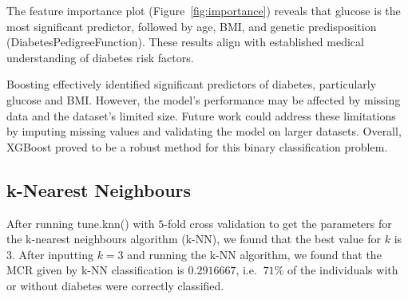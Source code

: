 \documentclass[12pt]{article}
\begin{document}
The feature importance plot (Figure~\ref{fig:importance}) reveals that glucose is the most significant predictor, followed by age, BMI, and genetic predisposition (DiabetesPedigreeFunction). These results align with established medical understanding of diabetes risk factors.




Boosting effectively identified significant predictors of diabetes, particularly glucose and BMI. However, the model's performance may be affected by missing data and the dataset's limited size. Future work could address these limitations by imputing missing values and validating the model on larger datasets. Overall, XGBoost proved to be a robust method for this binary classification problem.

\subsection{k-Nearest Neighbours}

After running tune.knn() with $5$-fold cross validation to get the parameters for the k-nearest neighbours algorithm (k-NN), we found that the best value for $k$ is $3$. After inputting $k=3$ and running the k-NN algorithm, we found that the MCR given by k-NN classification is $0.2916667$, i.e. $~71\%$ of the individuals with or without diabetes were correctly classified.
\end{document}
